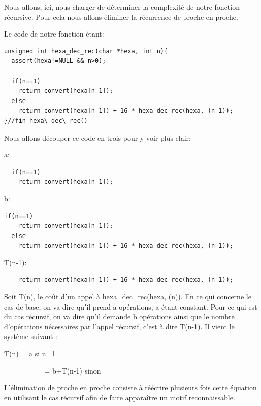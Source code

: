 \documentclass[a4paper, 11pt, oneside]{article}
\begin{document}
Nous allons, ici, nous charger de déterminer la complexité de notre fonction 
récursive. Pour cela nous allons éliminer la récurrence de proche en proche.

Le code de notre fonction étant:
\begin{lstlisting}
unsigned int hexa_dec_rec(char *hexa, int n){
  assert(hexa!=NULL && n>0);

  if(n==1)
    return convert(hexa[n-1]);
  else
    return convert(hexa[n-1]) + 16 * hexa_dec_rec(hexa, (n-1));
}//fin hexa\_dec\_rec()
\end{lstlisting}
\vspace{0.5cm}

Nous allons découper ce code en trois pour y voir plus clair:

\begin{center}
    a:
\end{center}
\begin{lstlisting}
  if(n==1)
    return convert(hexa[n-1]);
\end{lstlisting}

\begin{center}
    b:
\end{center}
\begin{lstlisting}
if(n==1)
    return convert(hexa[n-1]);
  else
    return convert(hexa[n-1]) + 16 * hexa_dec_rec(hexa, (n-1));
\end{lstlisting}

\begin{center}
    T(n-1):
\end{center}
\begin{lstlisting}
    return convert(hexa[n-1]) + 16 * hexa_dec_rec(hexa, (n-1));
\end{lstlisting}

Soit T(n), le coût d$'$un appel à hexa\_dec\_rec(hexa, (n)).
En ce qui concerne le cas de base, on va dire qu$'$il prend a opérations, a étant
constant. Pour ce qui est du cas récursif, on va dire qu$'$il demande b
opérations ainsi que le nombre d’opérations nécessaires par l’appel récursif,
c$'$est à dire T(n-1). Il vient le système suivant :

\begin{center}
    T(n) = a si n=1
    
    \textcolor{white}{----------------} = b+T(n-1) sinon
\end{center}

L’élimination de proche en proche consiste à réécrire plusieurs fois cette
équation en utilisant le cas récursif afin de faire apparaître un motif
reconnaissable.
\end{document}

